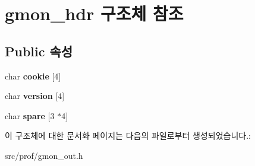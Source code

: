 \hypertarget{structgmon__hdr}{}\section{gmon\+\_\+hdr 구조체 참조}
\label{structgmon__hdr}
\subsection*{Public 속성}
\begin{DoxyCompactItemize}
\item 
\mbox{\label{structgmon__hdr_a9e6e4c738f31c7bfe47a4507f9eb77fa}} 
char {\bfseries cookie} \mbox{[}4\mbox{]}
\item 
\mbox{\label{structgmon__hdr_a7c55998776369522f545c4d74889d92e}} 
char {\bfseries version} \mbox{[}4\mbox{]}
\item 
\mbox{\label{structgmon__hdr_a6d6fb9f3dc97f964c24f900cace54992}} 
char {\bfseries spare} \mbox{[}3 $\ast$4\mbox{]}
\end{DoxyCompactItemize}


이 구조체에 대한 문서화 페이지는 다음의 파일로부터 생성되었습니다.\+:\begin{DoxyCompactItemize}
\item 
src/prof/gmon\+\_\+out.\+h\end{DoxyCompactItemize}
